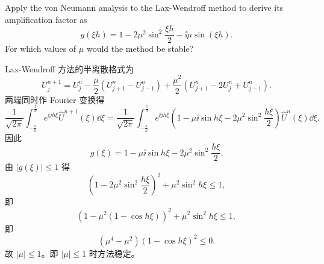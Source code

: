 \documentclass[lang=cn,a4paper,newtx,bibend=bibtex]{elegantpaper}
\begin{document}
\begin{prob}[Exercise 11.97]
  Apply the von Neumann analysis to the Lax-Wendroff method to derive its amplification factor as
  \begin{equation*}
    g(\xi h) = 1-2\mu^2\sin^2\dfrac{\xi h}2 - \ii\mu\sin(\xi h).
  \end{equation*}
  For which values of $\mu$ would the method be stable?
\end{prob}

\begin{solution}
  Lax-Wendroff 方法的半离散格式为
  \begin{equation*}
    U_j^{n+1} = U_j^n - \dfrac{\mu}2(U_{j+1}^n - U_{j-1}^n) + \dfrac{\mu^2}2(U_{j+1}^n - 2U_j^n + U_{j-1}^n).
  \end{equation*}
  两端同时作 Fourier 变换得
  \begin{equation*}
    \dfrac 1{\sqrt{2\pi}}\int_{-\frac{\pi}h}^{\frac{\pi}h}e^{\ii jh\xi}\hat{U}^{n+1}(\xi)\dd\xi
    = \dfrac 1{\sqrt{2\pi}}\int_{-\frac{\pi}h}^{\frac {\pi}h}e^{\ii jh\xi}\left(1-\mu\ii\sin h\xi-2\mu^2\sin^2\dfrac{h\xi}2\right)\hat{U}^n(\xi)\dd\xi.
  \end{equation*}
  因此
  \begin{equation*}
    g(\xi) = 1-\mu\ii\sin h\xi-2\mu^2\sin^2\dfrac{h\xi}2.    
  \end{equation*}
  由 $|g(\xi)|\leq 1$ 得
  \begin{equation*}
    (1-2\mu^2\sin^2\dfrac{h\xi}2)^2 + \mu^2\sin^2 h\xi \leq 1,
  \end{equation*}
  即
  \begin{equation*}
    (1-\mu^2(1-\cos h\xi))^2 + \mu^2\sin^2 h\xi \leq 1,
  \end{equation*}
  即
  \begin{equation*}
    (\mu^4-\mu^2)(1-\cos h\xi)^2\leq 0.
  \end{equation*}
  故 $|\mu|\leq 1$。即 $|\mu|\leq 1$ 时方法稳定。
\end{solution}

\nocite{*}
\printbibliography[heading=bibintoc, title=\ebibname]
\end{document}
